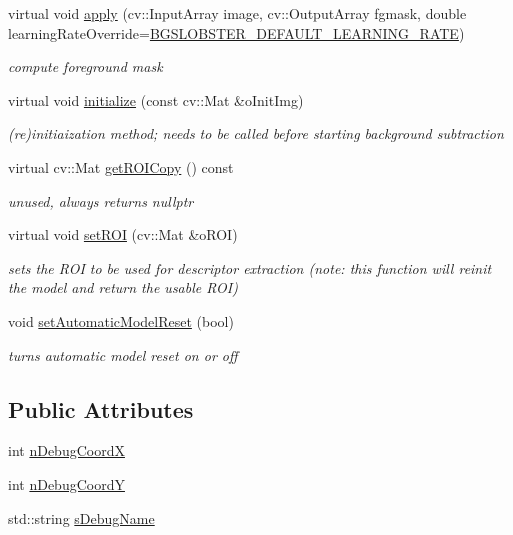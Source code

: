 \begin{DoxyCompactItemize}
virtual void \mbox{\hyperlink{class_background_subtractor_l_o_b_s_t_e_r_a58c127d4b95230d1e7fdc64055943ef3}{apply}} (cv\+::\+Input\+Array image, cv\+::\+Output\+Array fgmask, double learning\+Rate\+Override=\mbox{\hyperlink{_background_subtractor_l_o_b_s_t_e_r_8h_a2d317f4a065c4c58c7241080d9c4457c}{B\+G\+S\+L\+O\+B\+S\+T\+E\+R\+\_\+\+D\+E\+F\+A\+U\+L\+T\+\_\+\+L\+E\+A\+R\+N\+I\+N\+G\+\_\+\+R\+A\+TE}})
\begin{DoxyCompactList}\small\item\em compute foreground mask \end{DoxyCompactList}\item 
virtual void \mbox{\hyperlink{class_background_subtractor_l_b_s_p_ac6b854f94414497b143375d4a0ae8b6f}{initialize}} (const cv\+::\+Mat \&o\+Init\+Img)
\begin{DoxyCompactList}\small\item\em (re)initiaization method; needs to be called before starting background subtraction \end{DoxyCompactList}\item 
virtual cv\+::\+Mat \mbox{\hyperlink{class_background_subtractor_l_b_s_p_a9843f87f8adcd0e85274303f9210b883}{get\+R\+O\+I\+Copy}} () const
\begin{DoxyCompactList}\small\item\em unused, always returns nullptr \end{DoxyCompactList}\item 
virtual void \mbox{\hyperlink{class_background_subtractor_l_b_s_p_a34dc38d3d925d46d289c750786f232dc}{set\+R\+OI}} (cv\+::\+Mat \&o\+R\+OI)
\begin{DoxyCompactList}\small\item\em sets the R\+OI to be used for descriptor extraction (note\+: this function will reinit the model and return the usable R\+OI) \end{DoxyCompactList}\item 
void \mbox{\hyperlink{class_background_subtractor_l_b_s_p_a31b8474f8b4ffa6ef08ec682cfcef9b0}{set\+Automatic\+Model\+Reset}} (bool)
\begin{DoxyCompactList}\small\item\em turns automatic model reset on or off \end{DoxyCompactList}\end{DoxyCompactItemize}
\subsection*{Public Attributes}
\begin{DoxyCompactItemize}
\item 
int \mbox{\hyperlink{class_background_subtractor_l_b_s_p_a49771cd7b2c8354cde3da6e593d3febe}{n\+Debug\+CoordX}}
\item 
int \mbox{\hyperlink{class_background_subtractor_l_b_s_p_a8e1451fd90eb4459aa84ea5e7133268a}{n\+Debug\+CoordY}}
\item 
std\+::string \mbox{\hyperlink{class_background_subtractor_l_b_s_p_ada55b4a5eec8c82d0e05b0f9f1600ecb}{s\+Debug\+Name}}
\end{DoxyCompactItemize}
